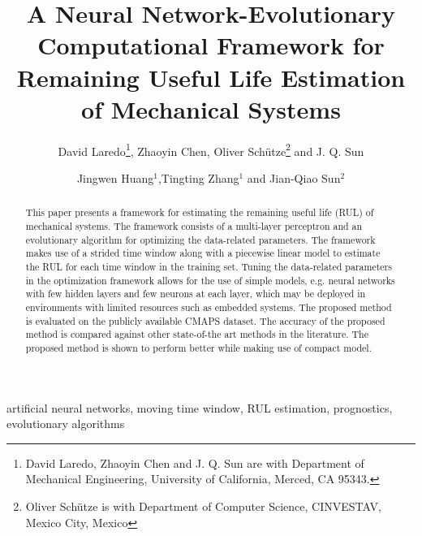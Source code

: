 


\begin{frontmatter}

\title{A Neural Network-Evolutionary Computational Framework for Remaining Useful Life Estimation of Mechanical Systems}

\author{David Laredo\thanks{David Laredo, Zhaoyin Chen and J. Q. Sun are with Department of Mechanical Engineering, University of California, Merced, CA 95343.}, Zhaoyin Chen, Oliver Sch\"utze\thanks{Oliver Sch\"utze is with Department of Computer Science, CINVESTAV, Mexico City, Mexico} and J. Q. Sun}%


\author{Jingwen Huang$^{1}$,Tingting Zhang$^{1}$ and Jian-Qiao Sun$^{2}$}
\address{$^{1}$Beijing University of Chemical Technology\\
Beijing, 100029, China\\
$^{2}$Department of Mechanical Engineering\\
School of Engineering, University of California\\
Merced, CA 95343, USA\\
Corresponding author. Email: jqsun@ucmerced.edu}

\begin{abstract}
This paper presents a framework for estimating the remaining useful life (RUL) of mechanical systems. The framework consists of a multi-layer perceptron and an evolutionary algorithm for optimizing the data-related parameters. The framework makes use of a strided time window along with a piecewise linear model to estimate the RUL for each time window in the training set. Tuning the data-related parameters in the optimization framework allows for the use of simple models, e.g. neural networks with few hidden layers and few neurons at each layer, which may be deployed in environments with limited resources such as embedded systems. The proposed method is evaluated on the publicly available CMAPS dataset. The accuracy of the proposed method is compared against other state-of-the art methods in the literature. The proposed method is shown to perform better while making use of compact model.

\end{abstract}


\begin{keyword}
artificial neural networks\sep
moving time window\sep
RUL estimation\sep
prognostics\sep
evolutionary algorithms
\end{keyword}

\end{frontmatter}

